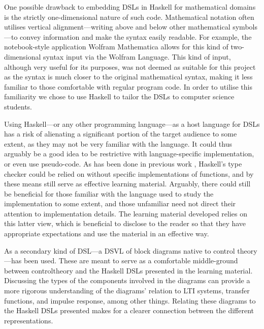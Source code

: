 One possible drawback to embedding \gls{DSL}s in \gls{Haskell} for mathematical domains is the strictly one-dimensional nature of such code. Mathematical notation often utilises vertical alignment---writing above and below other mathematical symbols---to convey information and make the syntax easily readable. For example, the notebook-style application Wolfram Mathematica \cite{Mathematica} allows for this kind of two-dimensional syntax input via the Wolfram Language. This kind of input, although very useful for its purposes, was not deemed as suitable for this project as the syntax is much closer to the original mathematical syntax, making it less familiar to those comfortable with regular program code. In order to utilise this familiarity we chose to use \gls{Haskell} to tailor the \gls{DSL}s to computer science students. 

Using \gls{Haskell}---or any other programming language---as a host language for \gls{DSL}s has a risk of alienating a significant portion of the target audience to some extent, as they may not be very familiar with the language. It could thus arguably be a good idea to be restrictive with language-specific implementation, or even use pseudo-code. As has been done in previous work \cite{dslsofmath}, \gls{Haskell}'s type checker could be relied on without specific implementations of functions, and by these means still serve as effective learning material. Arguably, there could still be beneficial for those familiar with the language used to study the implementation to some extent, and those unfamiliar need not direct their attention to implementation details. The learning material developed relies on this latter view, which is beneficial to disclose to the reader so that they have appropriate expectations and use the material in an effective way.

As a secondary kind of \gls{DSL}---a \gls{DSVL} of block diagrams native to control theory---has been used. These are meant to serve as a comfortable middle-ground between \gls{controltheory} and the \gls{Haskell} \gls{DSL}s presented in the learning material. Discussing the types of the components involved in the diagrams can provide a more rigorous understanding of the diagrams' relation to \gls{LTI} systems, transfer functions, and impulse response, among other things. Relating these diagrams to the \gls{Haskell} \gls{DSL}s presented makes for a clearer connection between the different representations. 



